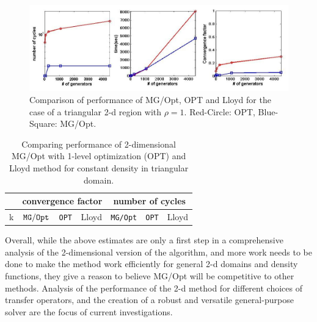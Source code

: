\documentclass{siamltex}
\begin{document}
\begin{figure}[h]
\centering
  \includegraphics[width=1.0\textwidth]{comp_opt_mg_low1.jpg}
  \caption{Comparison of performance of MG/Opt, OPT and Lloyd for the case of a triangular 2-d %
  region with $\rho=1$. Red-Circle: OPT, Blue-Square: MG/Opt.} %
\label{fig:2d_comp}
\end{figure}

\begin{table}
\begin{center}
\begin{tabular}{| l |c | c | c | c  |c|c|} \hline
 &\multicolumn{3}{|c|}{convergence factor} &\multicolumn{3}{|c|}{number of cycles }\\ \hline
k &${\tt MG/Opt}$&{\tt OPT}&Lloyd & {\tt MG/Opt} &{\tt OPT}&Lloyd \\ \hline
 \end{tabular}
\end{center}
\caption{Comparing performance of 2-dimensional MG/Opt with 1-level optimization (OPT) and Lloyd method for constant density in triangular domain. }
\label{mytable2}
\end{table}

Overall, while the above estimates are only a first step in a comprehensive analysis of the %
2-dimensional version of the algorithm, and more work needs to be done to make the method work efficiently for general 2-d domains and density functions,  they give a reason to believe MG/Opt will be %
competitive to other methods. Analysis of the performance of the 2-d method for different choices %
of transfer operators, and the creation of a robust and versatile general-purpose solver are the %
focus of current investigations.
\end{document}
